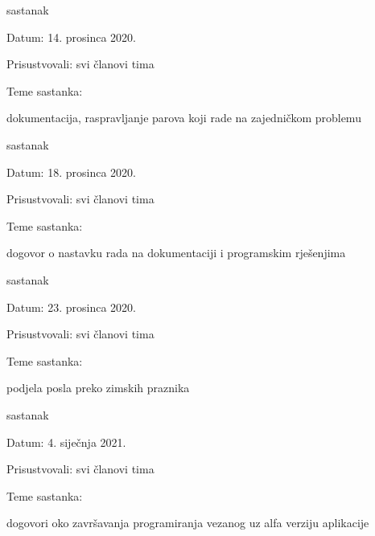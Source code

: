 \begin{packed_enum}
			\item  sastanak
			\item[] \begin{packed_item}
				\item Datum: 14. prosinca 2020. 
				\item Prisustvovali: svi članovi tima
				\item Teme sastanka:
				\begin{packed_item}
					\item  dokumentacija, raspravljanje parova koji rade na zajedničkom problemu
				\end{packed_item}
			\end{packed_item}
			
			\item  sastanak
			\item[] \begin{packed_item}
				\item Datum: 18. prosinca 2020. 
				\item Prisustvovali: svi članovi tima
				\item Teme sastanka:
				\begin{packed_item}
					\item  dogovor o nastavku rada na dokumentaciji i programskim rješenjima
				\end{packed_item}
			\end{packed_item}
			
			\item  sastanak
			\item[] \begin{packed_item}
				\item Datum: 23. prosinca 2020. 
				\item Prisustvovali: svi članovi tima
				\item Teme sastanka:
				\begin{packed_item}
					\item  podjela posla preko zimskih praznika
				\end{packed_item}
			\end{packed_item}
		
		\item  sastanak
		\item[] \begin{packed_item}
			\item Datum: 4. siječnja 2021. 
			\item Prisustvovali: svi članovi tima
			\item Teme sastanka:
			\begin{packed_item}
				\item dogovori oko završavanja programiranja vezanog uz alfa verziju aplikacije
			\end{packed_item}
		\end{packed_item}
			

\end{packed_enum}
